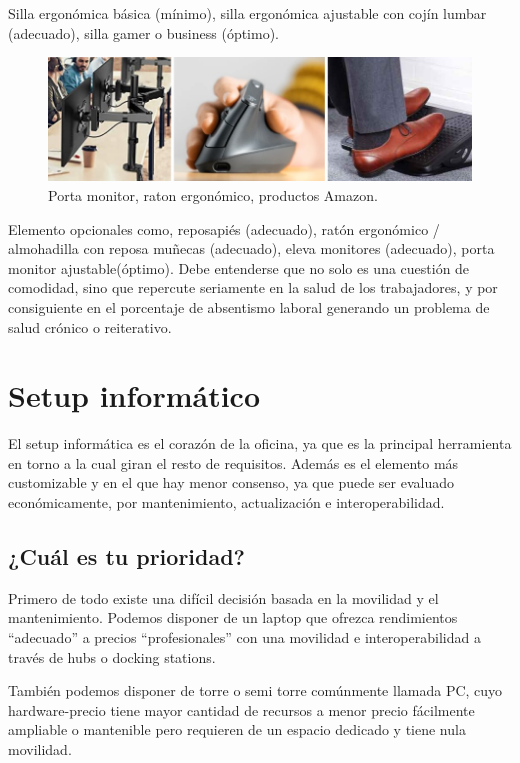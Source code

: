 Silla ergonómica básica (mínimo), silla ergonómica ajustable con cojín lumbar (adecuado), silla gamer o business (óptimo).

\begin{figure}[htb]
\begin{center}
\includegraphics[width=1\textwidth]{./figuras/amazon_extras}
\caption{Porta monitor, raton ergonómico, productos Amazon.}
\label{F:amazon_extras}
\end{center}
\end{figure}

Elemento opcionales como, reposapiés (adecuado), ratón ergonómico / almohadilla con reposa muñecas (adecuado), eleva monitores (adecuado), porta monitor ajustable(óptimo). Debe entenderse que no solo es una cuestión de comodidad, sino que repercute seriamente en la salud de los trabajadores, y por consiguiente en el porcentaje de absentismo laboral generando un problema de salud crónico o reiterativo.

\section{Setup informático}\label{S:setup_informatico}

El setup informática es el corazón de la oficina, ya que es la principal herramienta en torno a la cual giran el resto de requisitos. Además es el elemento más customizable y en el que hay menor consenso, ya que puede ser evaluado económicamente, por mantenimiento, actualización e interoperabilidad.

\subsection{¿Cuál es tu prioridad?}
Primero de todo existe una difícil decisión basada en la movilidad y el mantenimiento. Podemos disponer de un laptop que ofrezca rendimientos “adecuado” a precios “profesionales” con una movilidad e interoperabilidad a través de hubs o docking stations.

También podemos disponer de torre o semi torre comúnmente llamada PC, cuyo hardware-precio tiene mayor cantidad de recursos a menor precio fácilmente ampliable o mantenible pero requieren de un espacio dedicado y tiene nula movilidad.


